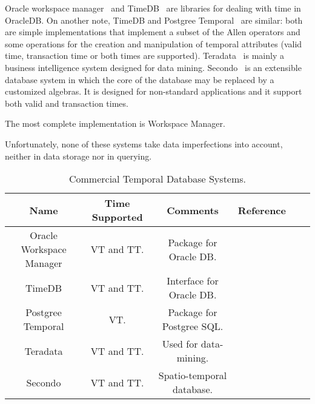 Oracle workspace manager~\cite{oracle2009} and TimeDB~\cite{timedb2005} are libraries for dealing with time in OracleDB. On another note, TimeDB and Postgree Temporal~\cite{posgree2009} are similar: both are simple implementations that implement a subset of the Allen operators and some operations for the creation and manipulation of temporal attributes (valid time, transaction time or both times are supported). Teradata~\cite{teradata2011} is mainly a business intelligence system designed for data mining. Secondo~\cite{Dieker2000} is an extensible database system in which the core of the database may be replaced by a customized algebras. It is designed for non-standard applications and it support both valid and transaction times. 

 The most complete implementation is Workspace Manager.

Unfortunately, none of these systems take data imperfections into account, neither in data storage nor in querying.

\begin{table}
\centering
\caption{Commercial Temporal Database Systems. }
\begin{tabular}{c c c c c c }
\hline
\textbf{Name} & \textbf{Time Supported} & \textbf{Comments} & \textbf{Reference}  \\ \hline
Oracle Workspace Manager & VT and TT. & Package for Oracle DB. & \cite{oracle2009}\\
TimeDB & VT and TT. & Interface for Oracle DB. & \cite{timedb2005}\\
Postgree Temporal & VT. & Package for Postgree SQL. & \cite{posgree2009}\\
Teradata & VT and TT. & Used for data-mining. & \cite{teradata2011}\\
Secondo & VT and TT. & Spatio-temporal database. & \cite{Guting} \\
\hline 
\end{tabular}
\label{table:commercial-temporal-db}



\end{table}

